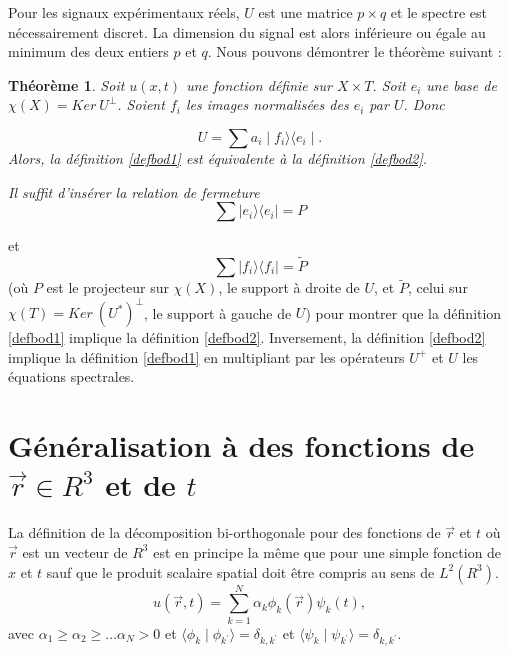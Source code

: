 \documentclass{book}
\newtheorem{thm}{Th\'eor\`eme}[chapter]
\newenvironment{pf}{{\bf Preuve.} \it}{\rm}
\begin{document}
Pour les signaux exp\'erimentaux r\'eels, $U$ est une matrice $p\times q$
et le spectre est n\'ecessairement discret.
La dimension du signal est alors inf\'erieure ou \'egale au 
minimum des deux entiers $p$ et $q$.
Nous pouvons d\'emontrer le th\'eor\`eme suivant :
\begin{thm}
Soit $u(x,t)$ une fonction d\'efinie sur $X \times T$.
Soit $e_i$ une base de $\chi(X)=Ker\ U^\perp$. 
Soient $f_i$ les images normalis\'ees des $e_i$ par $U$.
Donc 

\begin{equation}
U=\sum a_i \mid f_i\rangle \langle e_i\mid .
\end{equation}
Alors, la d\'efinition \ref{defbod1} est \'equivalente \`a la
d\'efinition \ref{defbod2}.
\end{thm}
\begin{pf}
Il suffit d'ins\'erer la relation de fermeture 
\begin{equation}
\sum \mid e_i\rangle \langle e_i\mid =P
\end{equation}

et 
\begin{equation}
\sum \mid f_i\rangle \langle f_i\mid =\tilde P
\end{equation}
(o\`u $P$ est le projecteur sur
$\chi(X)$, le support \`a droite de $U$, et $\tilde P$, celui sur
$\chi(T)=Ker\ (U^*)^\perp$, le support \`a gauche de $U$) pour montrer
que la d\'efinition  \ref{defbod1} 
implique la d\'efinition \ref{defbod2}.
Inversement, la d\'efinition \ref{defbod2} implique la d\'efinition
\ref{defbod1}  en multipliant par les op\'erateurs $U^+$ et $U$ 
les \'equations spectrales.
\end{pf}

\section{G\'en\'eralisation \`a des fonctions de $\vec r\in R^3$ et de $t$} \label{secgeneplus}

La d\'efinition de la d\'ecomposition bi-orthogonale pour des fonctions
de $\vec r$ et $t$ o\`u 
$\vec r$ est un vecteur de $R^3$  est en principe la m\^eme que pour une
simple fonction de 
$x$ et $t$ sauf que le produit scalaire spatial doit \^etre compris au
sens de $L^2(R^3)$.
\begin{equation}
u(\vec r,t)=\sum_{k=1}^{N} \alpha_k \phi_k(\vec r)\psi_k(t),
\end{equation}
avec $\alpha_1\geq\alpha_2\geq\dots\alpha_N>0$ et 
$\langle \phi_k\mid \phi_{k^\prime}\rangle =\delta_{k,k^\prime}$ et
$\langle \psi_k\mid \psi_{k^\prime}\rangle =\delta_{k,k^\prime}$.
\end{document}
